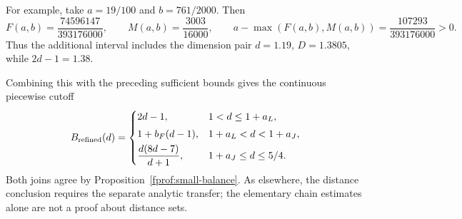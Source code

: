 For example, take \(a=19/100\) and \(b=761/2000\). Then
$$
 F(a,b)=\frac{74596147}{393176000},\qquad
 M(a,b)=\frac{3003}{16000},\qquad
 a-\max(F(a,b),M(a,b))=\frac{107293}{393176000}>0.
$$
Thus the additional interval includes the dimension pair
\(d=1.19\), \(D=1.3805\), while \(2d-1=1.38\).

Combining this with the preceding sufficient bounds gives the continuous
piecewise cutoff
\begin{equation}\label{fprof:smallslopecurve}
 B_{\rm refined}(d)=\begin{cases}
 2d-1,&1<d\le1+a_L,\\[3pt]
 1+b_F(d-1),&1+a_L<d<1+a_J,\\[3pt]
 \dfrac{d(8d-7)}{d+1},&1+a_J\le d\le5/4.
 \end{cases}
\end{equation}
Both joins agree by Proposition~\ref{fprof:small-balance}. As elsewhere,
the distance conclusion requires the separate analytic transfer; the
elementary chain estimates alone are not a proof about distance sets.
